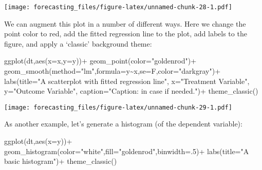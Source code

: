\documentclass[
  oneside]{book}
\newenvironment{Shaded}{\begin{snugshade}}{\end{snugshade}}
\newcommand{\AttributeTok}[1]{\textcolor[rgb]{0.77,0.63,0.00}{#1}}
\newcommand{\DecValTok}[1]{\textcolor[rgb]{0.00,0.00,0.81}{#1}}
\newcommand{\FunctionTok}[1]{\textcolor[rgb]{0.00,0.00,0.00}{#1}}
\newcommand{\NormalTok}[1]{#1}
\newcommand{\SpecialCharTok}[1]{\textcolor[rgb]{0.00,0.00,0.00}{#1}}
\newcommand{\StringTok}[1]{\textcolor[rgb]{0.31,0.60,0.02}{#1}}
\begin{document}
\texttt{[image: forecasting\_files/figure-latex/unnamed-chunk-28-1.pdf]}

We can augment this plot in a number of different ways. Here we change the point color to red, add the fitted regression line to the plot, add labels to the figure, and apply a `classic' background theme:

\begin{Shaded}
\begin{Highlighting}[]
\FunctionTok{ggplot}\NormalTok{(dt,}\FunctionTok{aes}\NormalTok{(}\AttributeTok{x=}\NormalTok{x,}\AttributeTok{y=}\NormalTok{y))}\SpecialCharTok{+}
  \FunctionTok{geom\_point}\NormalTok{(}\AttributeTok{color=}\StringTok{"goldenrod"}\NormalTok{)}\SpecialCharTok{+}
  \FunctionTok{geom\_smooth}\NormalTok{(}\AttributeTok{method=}\StringTok{"lm"}\NormalTok{,}\AttributeTok{formula=}\NormalTok{y}\SpecialCharTok{\textasciitilde{}}\NormalTok{x,}\AttributeTok{se=}\NormalTok{F,}\AttributeTok{color=}\StringTok{"darkgray"}\NormalTok{)}\SpecialCharTok{+}
  \FunctionTok{labs}\NormalTok{(}\AttributeTok{title=}\StringTok{"A scatterplot with fitted regression line"}\NormalTok{, }
       \AttributeTok{x=}\StringTok{"Treatment Variable"}\NormalTok{, }
       \AttributeTok{y=}\StringTok{"Outcome Variable"}\NormalTok{, }
       \AttributeTok{caption=}\StringTok{"Caption: in case if needed."}\NormalTok{)}\SpecialCharTok{+}
  \FunctionTok{theme\_classic}\NormalTok{()}
\end{Highlighting}
\end{Shaded}

\texttt{[image: forecasting\_files/figure-latex/unnamed-chunk-29-1.pdf]}

As another example, let's generate a histogram (of the dependent variable):

\begin{Shaded}
\begin{Highlighting}[]
\FunctionTok{ggplot}\NormalTok{(dt,}\FunctionTok{aes}\NormalTok{(}\AttributeTok{x=}\NormalTok{y))}\SpecialCharTok{+}
  \FunctionTok{geom\_histogram}\NormalTok{(}\AttributeTok{color=}\StringTok{"white"}\NormalTok{,}\AttributeTok{fill=}\StringTok{"goldenrod"}\NormalTok{,}\AttributeTok{binwidth=}\NormalTok{.}\DecValTok{5}\NormalTok{)}\SpecialCharTok{+}
  \FunctionTok{labs}\NormalTok{(}\AttributeTok{title=}\StringTok{"A basic histogram"}\NormalTok{)}\SpecialCharTok{+}
  \FunctionTok{theme\_classic}\NormalTok{()}
\end{Highlighting}
\end{Shaded}
\end{document}
